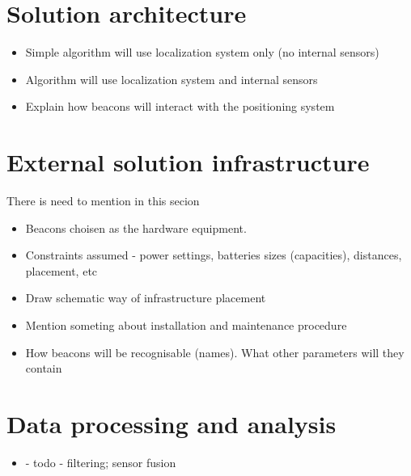 \documentclass[../main.tex]{subfiles}
\begin{document}

\section{Solution architecture} %
\label{sec:solution_architecture}

\begin{itemize}
	\item Simple algorithm will use localization system only (no internal sensors)
	\item Algorithm will use localization system and internal sensors
	\item Explain how beacons will interact with the positioning system
\end{itemize}


\section{External solution infrastructure} %
\label{sec:external_solution_infrastructure}

There is need to mention in this secion
\begin{itemize}
	\item Beacons choisen as the hardware equipment.
	\item Constraints assumed - power settings, batteries sizes (capacities), distances, placement, etc
	\item Draw schematic way of infrastructure placement
	\item Mention someting about installation and maintenance procedure
	\item How beacons will be recognisable (names). What other parameters will they contain
\end{itemize}

\section{Data processing and analysis} %
\label{sec:data_processing}

\begin{itemize}
	\item - todo - filtering; sensor fusion
\end{itemize}

\end{document}
